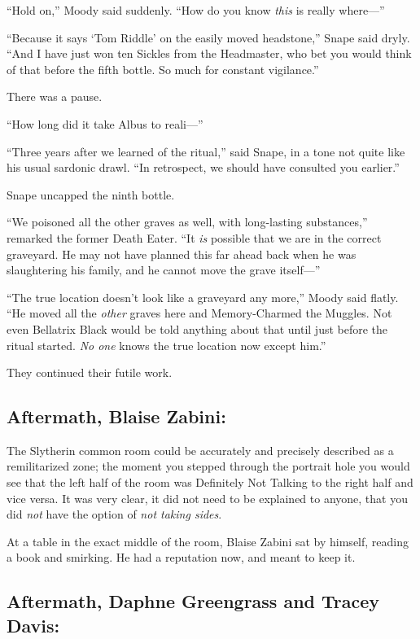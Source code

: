 “Hold on,” Moody said suddenly. “How do you know \emph{this} is really where—”

“Because it says ‘Tom Riddle’ on the easily moved headstone,” Snape said dryly. “And I have just won ten Sickles from the Headmaster, who bet you would think of that before the fifth bottle. So much for constant vigilance.”

There was a pause.

“How long did it take Albus to reali—”

“Three years after we learned of the ritual,” said Snape, in a tone not quite like his usual sardonic drawl. “In retrospect, we should have consulted you earlier.”

Snape uncapped the ninth bottle.

“We poisoned all the other graves as well, with long-lasting substances,” remarked the former Death Eater. “It \emph{is} possible that we are in the correct graveyard. He may not have planned this far ahead back when he was slaughtering his family, and he cannot move the grave itself—”

“The true location doesn’t look like a graveyard any more,” Moody said flatly. “He moved all the \emph{other} graves here and Memory-Charmed the Muggles. Not even Bellatrix Black would be told anything about that until just before the ritual started. \emph{No one} knows the true location now except him.”

They continued their futile work.
\replacement{\sbreak}{}

\subsection{Aftermath, Blaise Zabini:}

\noindent{}The Slytherin common room could be accurately and precisely described as a remilitarized zone; the moment you stepped through the portrait hole you would see that the left half of the room was Definitely Not Talking to the right half and vice versa. It was very clear, it did not need to be explained to anyone, that you did \emph{not} have the option of \emph{not taking sides}.

At a table in the exact middle of the room, Blaise Zabini sat by himself, reading a book and smirking. He had a reputation now, and meant to keep it.
\replacement{\sbreak}{}

\subsection{Aftermath, Daphne Greengrass and Tracey Davis:}

